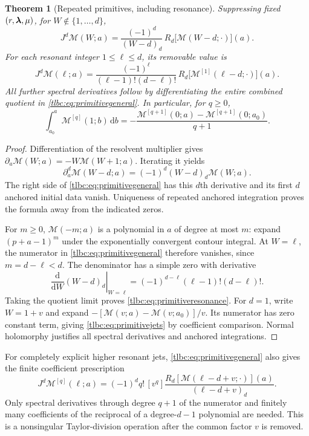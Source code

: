 \documentclass[11pt,letterpaper]{article}
\numberwithin{equation}{section}
\newtheorem{theorem}{Theorem}[section]
\theoremstyle{definition}\newtheorem{definition}[theorem]{Definition}
\theoremstyle{remark}\newtheorem{remark}[theorem]{Remark}
\newcommand{\dd}{\,\mathrm d}\newcommand{\ii}{\mathrm i}
\newcommand{\M}{\mathcal M}\newcommand{\T}{\mathcal T}\newcommand{\K}{\mathcal K}
\begin{document}
\begin{theorem}[Repeated primitives, including resonance]\label{tlbc:thm:primitives}
Suppressing fixed $(r,\boldsymbol\lambda,\mu)$, for $W\notin\{1,\ldots,d\}$,
\begin{equation}\label{tlbc:eq:primitivegeneral}
 J^d\M(W;a)
 =\frac{(-1)^d}{(W-d)_d}\,
       R_d\bigl[\M(W-d;\cdot)\bigr](a).
\end{equation}
For each resonant integer $1\le\ell\le d$, its removable value is
\begin{equation}\label{tlbc:eq:primitiveresonance}
 \boxed{\displaystyle
 J^d\M(\ell;a)
 =\frac{(-1)^\ell}{(\ell-1)!(d-\ell)!}\,
       R_d\bigl[\M^{[1]}(\ell-d;\cdot)\bigr](a).}
\end{equation}
All further spectral derivatives follow by differentiating the entire combined quotient in \eqref{tlbc:eq:primitivegeneral}. In particular, for $q\ge0$,
\begin{equation}\label{tlbc:eq:primitivejets}
 \int_{a_0}^a\M^{[q]}(1;b)\dd b
 =-\frac{\M^{[q+1]}(0;a)-\M^{[q+1]}(0;a_0)}{q+1}.
\end{equation}
\end{theorem}
\begin{proof}
Differentiation of the resolvent multiplier gives
$\partial_a\M(W;a)=-W\M(W+1;a)$. Iterating it yields
\[
 \partial_a^d\M(W-d;a)=(-1)^d(W-d)_d\M(W;a).
\]
The right side of \eqref{tlbc:eq:primitivegeneral} has this $d$th derivative and its first $d$ anchored initial data vanish. Uniqueness of repeated anchored integration proves the formula away from the indicated zeros.

For $m\ge0$, $\M(-m;a)$ is a polynomial in $a$ of degree at most $m$: expand $(p+a-1)^m$ under the exponentially convergent contour integral. At $W=\ell$, the numerator in \eqref{tlbc:eq:primitivegeneral} therefore vanishes, since $m=d-\ell<d$. The denominator has a simple zero with derivative
\[
 \left.\frac{\mathrm d}{\mathrm dW}(W-d)_d\right|_{W=\ell}
 =(-1)^{d-\ell}(\ell-1)!(d-\ell)!.
\]
Taking the quotient limit proves \eqref{tlbc:eq:primitiveresonance}. For $d=1$, write $W=1+v$ and expand
$-[\M(v;a)-\M(v;a_0)]/v$. Its numerator has zero constant term, giving \eqref{tlbc:eq:primitivejets} by coefficient comparison. Normal holomorphy justifies all spectral derivatives and anchored integrations.
\end{proof}

For completely explicit higher resonant jets, \eqref{tlbc:eq:primitivegeneral} also gives the finite coefficient prescription
\begin{equation}\label{tlbc:eq:higherresonantjets}
 J^d\M^{[q]}(\ell;a)
 =(-1)^dq!\,[v^q]
 \frac{R_d[\M(\ell-d+v;\cdot)](a)}{(\ell-d+v)_d}.
\end{equation}
Only spectral derivatives through degree $q+1$ of the numerator and finitely many coefficients of the reciprocal of a degree-$d-1$ polynomial are needed. This is a nonsingular Taylor-division operation after the common factor $v$ is removed.
\end{document}
